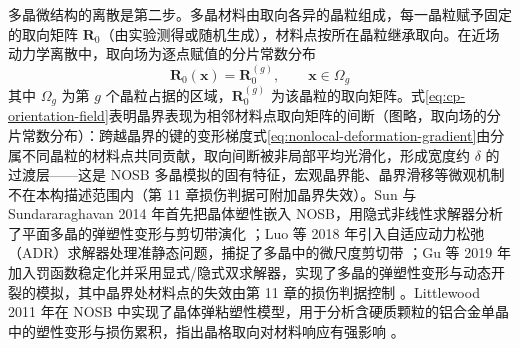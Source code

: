 多晶微结构的离散是第二步。多晶材料由取向各异的晶粒组成，每一晶粒赋予固定的取向矩阵 $\mathbf{R}_{0}$（由实验测得或随机生成），材料点按所在晶粒继承取向。在近场动力学离散中，取向场为逐点赋值的分片常数分布
\begin{equation}
  \mathbf{R}_{0}(\mathbf{x})=\mathbf{R}_{0}^{(g)},\qquad
  \mathbf{x}\in\Omega_{g}
  \label{eq:cp-orientation-field}
\end{equation}
其中 $\Omega_{g}$ 为第 $g$ 个晶粒占据的区域，$\mathbf{R}_{0}^{(g)}$ 为该晶粒的取向矩阵。式\eqref{eq:cp-orientation-field}表明晶界表现为相邻材料点取向矩阵的间断（图略，取向场的分片常数分布）：跨越晶界的键的变形梯度式\eqref{eq:nonlocal-deformation-gradient}由分属不同晶粒的材料点共同贡献，取向间断被非局部平均光滑化，形成宽度约 $\delta$ 的过渡层——这是 NOSB 多晶模拟的固有特征，宏观晶界能、晶界滑移等微观机制不在本构描述范围内（第 11 章损伤判据可附加晶界失效）。Sun 与 Sundararaghavan 2014 年首先把晶体塑性嵌入 NOSB，用隐式非线性求解器分析了平面多晶的弹塑性变形与剪切带演化 \cite{SunSundararaghavan2014}；Luo 等 2018 年引入自适应动力松弛（ADR）求解器处理准静态问题，捕捉了多晶中的微尺度剪切带 \cite{Luo2018}；Gu 等 2019 年加入罚函数稳定化并采用显式/隐式双求解器，实现了多晶的弹塑性变形与动态开裂的模拟，其中晶界处材料点的失效由第 11 章的损伤判据控制 \cite{GuZhangMadenci2019}。Littlewood 2011 年在 NOSB 中实现了晶体弹粘塑性模型，用于分析含硬质颗粒的铝合金单晶中的塑性变形与损伤累积，指出晶格取向对材料响应有强影响 \cite{Littlewood2011}。

